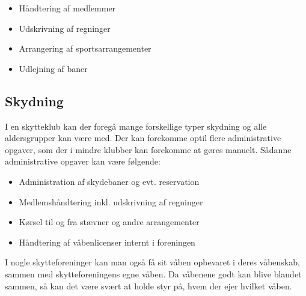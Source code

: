 \begin{itemize}
\item Håndtering af medlemmer
\item Udskrivning af regninger
\item Arrangering af sportsarrangementer
\item Udlejning af baner
\end{itemize}



\subsection{Skydning}

I en skytteklub kan der foregå mange forskellige typer skydning og alle aldersgrupper kan være med. Der kan forekomme optil flere administrative opgaver, som der i mindre klubber kan forekomme at gøres manuelt. Sådanne administrative opgaver kan være følgende:

\begin{itemize}
\item Administration af skydebaner og evt. reservation
\item Medlemshåndtering inkl. udskrivning af regninger
\item Kørsel til og fra stævner og andre arrangementer
\item Håndtering af våbenlicenser internt i foreningen
\end{itemize}

I nogle skytteforeninger kan man også få sit våben opbevaret i deres våbenskab, sammen med skytteforeningens egne våben. Da våbenene godt kan blive blandet sammen, så kan det være svært at holde styr på, hvem der ejer hvilket våben.


